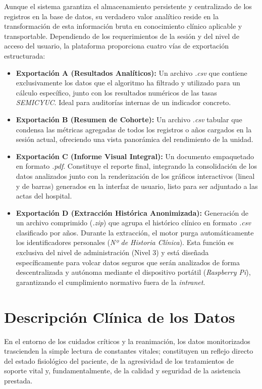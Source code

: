 Aunque el sistema garantiza el almacenamiento persistente y centralizado de los registros en la base de datos, su verdadero valor analítico reside en la transformación de esta información bruta en conocimiento clínico aplicable y transportable. Dependiendo de los requerimientos de la sesión y del nivel de acceso del usuario, la plataforma proporciona cuatro vías de exportación estructurada:

\begin{itemize}
    \item \textbf{Exportación A (Resultados Analíticos):} Un archivo \textit{.csv} que contiene exclusivamente los datos que el algoritmo ha filtrado y utilizado para un cálculo específico, junto con los resultados numéricos de las tasas \textit{SEMICYUC}. Ideal para auditorías internas de un indicador concreto.
    
    \item \textbf{Exportación B (Resumen de Cohorte):} Un archivo \textit{.csv} tabular que condensa las métricas agregadas de todos los registros o años cargados en la sesión actual, ofreciendo una vista panorámica del rendimiento de la unidad.
    
    \item \textbf{Exportación C (Informe Visual Integral):} Un documento empaquetado en formato \textit{.pdf}. Constituye el reporte final, integrando la consolidación de los datos analizados junto con la renderización de los gráficos interactivos (lineal y de barras) generados en la interfaz de usuario, listo para ser adjuntado a las actas del hospital.
    
    \item \textbf{Exportación D (Extracción Histórica Anonimizada):} Generación de un archivo comprimido (\textit{.zip}) que agrupa el histórico clínico en formato \textit{.csv} clasificado por años. Durante la extracción, el motor purga automáticamente los identificadores personales (\textit{Nº de Historia Clínica}). Esta función es exclusiva del nivel de administración (Nivel 3) y está diseñada específicamente para volcar datos seguros que serán analizados de forma descentralizada y autónoma mediante el dispositivo portátil (\textit{Raspberry Pi}), garantizando el cumplimiento normativo fuera de la \textit{intranet}.
\end{itemize}
    
\section{Descripción Clínica de los Datos}
En el entorno de los cuidados críticos y la reanimación, los datos monitorizados trascienden la simple lectura de constantes vitales; constituyen un reflejo directo del estado fisiológico del paciente, de la agresividad de los tratamientos de soporte vital y, fundamentalmente, de la calidad y seguridad de la asistencia prestada.

